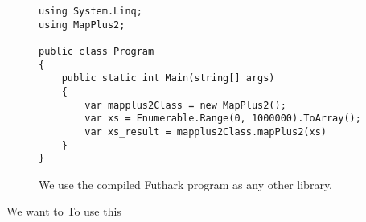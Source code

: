 \begin{figure}[H]
  \centering
\begin{verbatim}
using System.Linq;
using MapPlus2;

public class Program
{
    public static int Main(string[] args)
    {
        var mapplus2Class = new MapPlus2();
        var xs = Enumerable.Range(0, 1000000).ToArray();
        var xs_result = mapplus2Class.mapPlus2(xs)
    }
}
\end{verbatim}
  \caption{We use the compiled Futhark program as any other library.}
  \label{fig:shortfutharkprogram2}
\end{figure}

We want to 
To use this 
